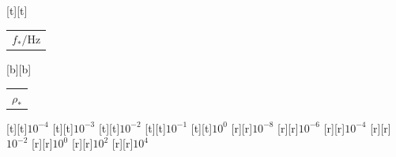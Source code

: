 %    
%
%
\begin{psfrags}%
\psfragscanon%
%
[t][t]{\color[rgb]{0,0,0}\setlength{\tabcolsep}{0pt}\begin{tabular}{c}{\Large$f_\ast/\mathrm{Hz}$}\end{tabular}}%
[b][b]{\color[rgb]{0,0,0}\setlength{\tabcolsep}{0pt}\begin{tabular}{c}{\Large$\rho_\ast$}\end{tabular}}%
%
[t][t]{$10^{-4}$}%
[t][t]{$10^{-3}$}%
[t][t]{$10^{-2}$}%
[t][t]{$10^{-1}$}%
[t][t]{$10^{0}$}%
%
[r][r]{$10^{-8}$}%
[r][r]{$10^{-6}$}%
[r][r]{$10^{-4}$}%
[r][r]{$10^{-2}$}%
[r][r]{$10^{0}$}%
[r][r]{$10^{2}$}%
[r][r]{$10^{4}$}%
%
%
\end{psfrags}%
%
